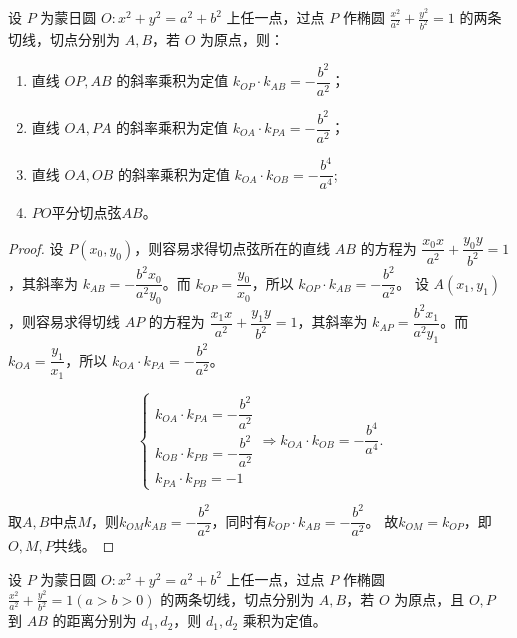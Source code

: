 \begin{corollary}设 $P$ 为蒙日圆 $O: x^2 + y^2 = a^2 + b^2$ 上任一点，过点 $P$ 作椭圆 $\frac{x^2}{a^2} + \frac{y^2}{b^2} = 1$ 的两条切线，切点分别为 $A, B$，若 $O$ 为原点，则：

    \begin{enumerate}
        \setlength{\itemsep}{-\itemsep}
        \item 直线 $OP, AB$ 的斜率乘积为定值 $k_{OP} \cdot k_{AB} = -\dfrac{b^2}{a^2}$；
        \item 直线 $OA, PA$ 的斜率乘积为定值 $k_{OA} \cdot k_{PA} = -\dfrac{b^2}{a^2}$；
        \item 直线 $OA, OB$ 的斜率乘积为定值 $k_{OA} \cdot k_{OB} = -\dfrac{b^4}{a^4}$;
        \item \(PO\)平分切点弦\(AB\)。
    \end{enumerate}
\end{corollary}
\begin{proof}

 设 $P(x_0, y_0)$，则容易求得切点弦所在的直线 $AB$ 的方程为 $\dfrac{x_0 x}{a^2} + \dfrac{y_0 y}{b^2} = 1$，其斜率为 $k_{AB} = -\dfrac{b^2 x_0}{a^2 y_0}$。而 $k_{OP} = \dfrac{y_0}{x_0}$，所以 $k_{OP} \cdot k_{AB} = -\dfrac{b^2}{a^2}$。
设 $A(x_1, y_1)$，则容易求得切线 $AP$ 的方程为 $\dfrac{x_1 x}{a^2} + \dfrac{y_1 y}{b^2} = 1$，其斜率为 $k_{AP} = \dfrac{b^2 x_1}{a^2 y_1}$。而 $k_{OA} = \dfrac{y_1}{x_1}$，所以 $k_{OA} \cdot k_{PA} = -\dfrac{b^2}{a^2}$。

    
    \[
    \begin{cases} 
    k_{OA} \cdot k_{PA} = -\dfrac{b^2}{a^2} \\
    k_{OB} \cdot k_{PB} = -\dfrac{b^2}{a^2} \\
    k_{PA} \cdot k_{PB} = -1 
    \end{cases}
    \Rightarrow k_{OA} \cdot k_{OB} = -\dfrac{b^4}{a^4}.
    \]

    取\(A, B\)中点\(M\)，则\(k_{OM}k_{AB}=-\dfrac{b^2}{a^2}\)，同时有$k_{OP} \cdot k_{AB} = -\dfrac{b^2}{a^2}$。
    故\(k_{OM}=k_{OP}\)，即\(O,M,P\)共线。



\end{proof}
\begin{corollary}
    设 $P$ 为蒙日圆 $O: x^2 + y^2 = a^2 + b^2$ 上任一点，过点 $P$ 作椭圆 $\frac{x^2}{a^2} + \frac{y^2}{b^2} = 1 (a > b > 0)$ 的两条切线，切点分别为 $A, B$，若 $O$ 为原点，且 $O, P$ 到 $AB$ 的距离分别为 $d_1, d_2$，则 $d_1, d_2$ 乘积为定值。
\end{corollary}
